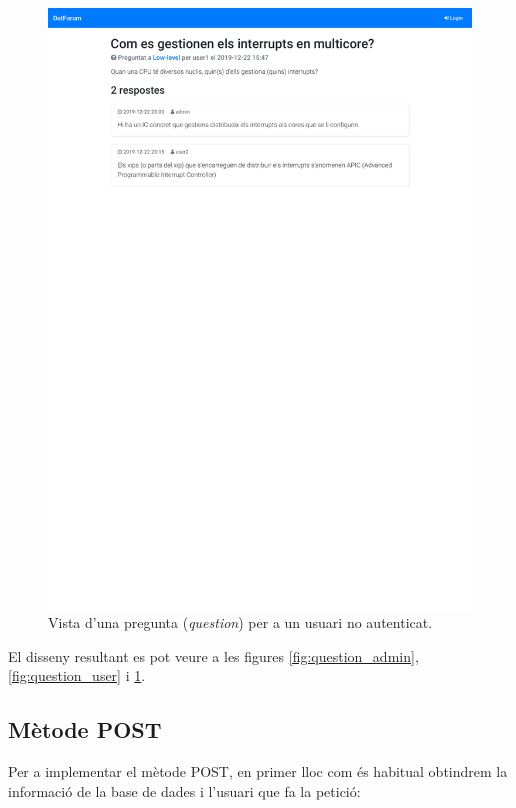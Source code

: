 \documentclass[catalan, a4paper]{scrartcl}
\begin{document}
\begin{figure}
\centering \includegraphics[trim={0 16cm 0 0}, clip, width=.98\columnwidth, cframe=gray]{screens/question_anonymous.pdf}
\caption{\label{fig:question_anonymous} Vista d'una pregunta (\emph{question}) per a un usuari no autenticat. }
\end{figure}

El disseny resultant es pot veure a les figures \ref{fig:question_admin},
\ref{fig:question_user} i \ref{fig:question_anonymous}.

\subsection*{Mètode \textsf{POST}}

Per a implementar el mètode \textsf{POST}, en primer lloc com és habitual
obtindrem la informació de la base de dades i l'usuari que fa la petició:
\end{document}
